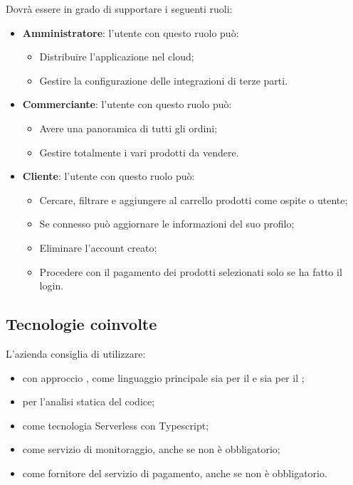 Dovrà essere in grado di supportare i seguenti ruoli:
\begin{itemize}
	\item \textbf{Amministratore}: l'utente con questo ruolo può:
		\begin{itemize}
			\item Distribuire l'applicazione nel cloud;
			\item Gestire la configurazione delle integrazioni di terze parti.
		\end{itemize}
	\item \textbf{Commerciante}: l'utente con questo ruolo può:
		\begin{itemize}
			\item Avere una panoramica di tutti gli ordini;
			\item Gestire totalmente i vari prodotti da vendere.
		\end{itemize}
	\item \textbf{Cliente}: l'utente con questo ruolo può:
	\begin{itemize}
		\item Cercare, filtrare e aggiungere al carrello prodotti come ospite o utente;
		\item Se connesso può aggiornare le informazioni del suo profilo;
		\item Eliminare l'account creato;
		\item Procedere con il pagamento dei prodotti selezionati solo se ha fatto il login.
	\end{itemize}
\end{itemize}

\subsection{Tecnologie coinvolte}
L'azienda consiglia di utilizzare:
\begin{itemize}
	\item {} con approccio , come linguaggio principale sia per il  e sia per il ;
	\item {} per l'analisi statica del codice;
	\item {} come tecnologia Serverless con Typescript;
	\item {} come servizio di monitoraggio, anche se non è obbligatorio;
	\item {} come fornitore del servizio di pagamento, anche se non è obbligatorio.
\end{itemize}

